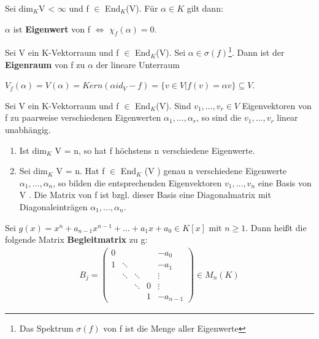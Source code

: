 \begin{lemma}
Sei dim$_K$V < $\infty$ und f $\in$ End$_K$(V). Für $\alpha \in K$ gilt dann:
\begin{center}
$\alpha$ ist \textbf{Eigenwert} von f $\Leftrightarrow$ $\chi_f(\alpha) = 0$.
\end{center}
\end{lemma}

\begin{definition}
Sei V ein K-Vektorraum und f $\in$ End$_K$(V).
Sei $\alpha \in \sigma(f)$\footnote{Das Spektrum $\sigma(f)$ von f ist die Menge aller Eigenwerte}. Dann ist der \textbf{Eigenraum} von f zu $\alpha$ der lineare Unterraum
\begin{center}
$V_f(\alpha) = V(\alpha) = Kern(\alpha id_V - f) = \{v \in V | f(v) = \alpha v\} \subseteq V$.
\end{center}
\end{definition}

\begin{lemma}
Sei V ein K-Vektorraum und f $\in$ End$_K$(V). Sind $v_1, …, v_r \in V$ Eigenvektoren von f zu paarweise verschiedenen Eigenwerten $\alpha_1, ..., \alpha_r$, so sind die $v_1, ..., v_r$ linear unabhängig.
\begin{enumerate}
\item Ist dim$_K$ V = n, so hat f höchstens n verschiedene Eigenwerte.
\item Sei dim$_K$ V = n. Hat f $\in$ End$_K$ (V ) genau n verschiedene Eigenwerte $\alpha_1, …, \alpha_n$, so bilden die entsprechenden Eigenvektoren $v_1, ..., v_n$ eine Basis von V . Die Matrix von f ist bzgl. dieser Basis eine Diagonalmatrix mit Diagonaleinträgen $\alpha_1, …, \alpha_n$.
\end{enumerate}
\end{lemma}


\begin{definition}
Sei $g(x) = x^n + a_{n-1}x^{n-1}+\ldots+a_1x + a_0 \in K[x]$ mit $n \geq 1$. Dann heißt die folgende Matrix \textbf{Begleitmatrix} zu g:
\begin{align*}
B_j =
\begin{pmatrix}
0 &        &		&  & -a_0 \\
1 & \ddots &		&  & -a_1 \\
  & \ddots & \ddots	&  & \vdots \\
  &        & \ddots	& 0 & \vdots \\
  &        &		& 1 & -a_{n-1}
\end{pmatrix}
\in M_n(K)
\end{align*} 
\end{definition}

